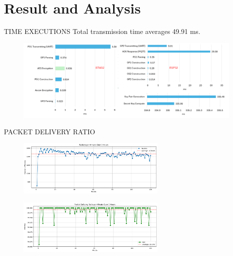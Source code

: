 \section{Result and Analysis}
\begin{frame}{TIME EXECUTIONS}
	Total transmission time averages 49.91 ms.
	\vspace{-0.2cm}
	\begin{figure}
		\centering
		\includegraphics[width=1\textwidth]{pic/res_time.pdf}
	\end{figure}
\end{frame}

\begin{frame}{PACKET DELIVERY RATIO}
	\begin{figure}
		\centering
		\includegraphics[width=0.65\textwidth]{pic/packet.png}
	\end{figure}
	\vspace{-0.3cm}
	\begin{figure}
		\centering
		\includegraphics[width=0.65\textwidth]{pic/pdr.png}
	\end{figure}
\end{frame}



